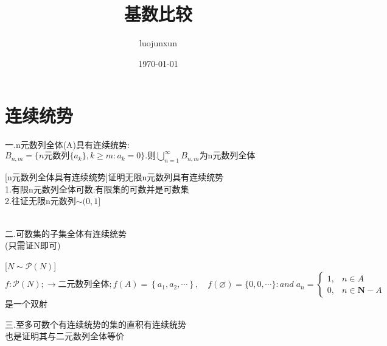 \documentclass[12pt, a4paper, oneside]{ctexart}
\title{\huge\textbf{基数比较}}
\author{luojunxun}
\date{\today}
\renewenvironment{proof}{\par\noindent{\textit{Proof:}\small}}{\\\par}
\begin{document}
\maketitle

\section*{连续统势}
\begin{center}
    一.n元数列全体(A)具有连续统势:
    $B_{n,m}=\{n\text{元数列}\{a_k\},k\geq m:a_k=0\}\text{.则}\bigcup\limits_{n=1}^\infty B_{n,m}\text{为n元数列全体}$\\
\end{center}
\begin{proof}[n元数列全体具有连续统势]{证明无限n元数列具有连续统势}\\
    1.有限n元数列全体可数:有限集的可数并是可数集\\
    2.往证无限n元数列$\sim (0,1]$\\
    \center{$\forall x\in (0,1],\exists !k_1.s.t.\frac{k_1-1}{n}<x \leqslant \frac{k_1}{n}$\\
    取$a_1=k_1-1$,又有唯一的$k_2,s.t.\frac{k_1-1}{n}+\frac{k_2-1}{n^2}<x \leqslant \frac{k_1-1}{n}+\frac{k_2}{n^2}$\\
    取$a_2=k_2-1$,以此类推,有:$\sum_{i=1}^m \frac{k_i-1}{n^i}<x \leqslant \sum_{i=1}^{m-1} \frac{k_i-1}{n^i}+\frac{k_m}{n^m}$\\
    令m趋近于无穷就有$x=\sum_{i=1}^{\infty} \frac{a_i}{n^i}$\\
    从而我们得到一个映射$f:(0,1]\to A:f(x)=\left\{a_1, a_2, \cdots, a_i, \cdots\right\} .$且f是双射}
\end{proof}


\begin{center}
    二.可数集的子集全体有连续统势\\(只需证N即可)
\end{center}
\begin{proof}[$N\sim\mathcal{P}(N)$]
    $f:\mathcal{P}(N);\to \text{二元数列全体};f(A)=\left\{a_1, a_2, \cdots\right\}, \quad f(\varnothing)=\{0,0, \cdots\}:
    and\;a_n= \begin{cases}1, & n \in A \\ 0, & n \in \mathbf{N}-A\end{cases}$是一个双射
\end{proof}


\begin{center}
    三.至多可数个有连续统势的集的直积有连续统势\\
    也是证明其与二元数列全体等价
\end{center}
\end{document}
